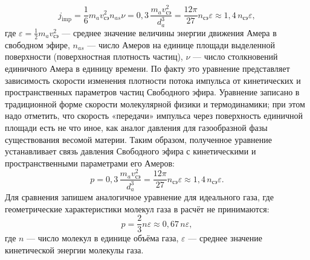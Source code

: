 \[
j_{\text{imp}} = \frac{1}{6} m_a v_{\text{сэ}}^2 n_{as} \nu = 0,3\, \frac{m_a v_{\text{сэ}}^2}{d_a^3} = \frac{12\pi}{27} n_{\text{сэ}} \varepsilon \approx 1,4\, n_{\text{сэ}} \varepsilon,
\]
где \(\varepsilon = \frac{1}{2} m_a v_{\text{сэ}}^2\) — среднее значение величины энергии движения Амера в свободном эфире, \(n_{as}\) — число Амеров на единице площади выделенной поверхности (поверхностная плотность частиц), \(\nu\) — число столкновений единичного Амера в единицу времени. По факту это уравнение представляет зависимость скорости изменения плотности потока импульса от кинетических и пространственных параметров частиц Свободного эфира. Уравнение записано в традиционной форме скорости молекулярной физики и термодинамики; при этом надо отметить, что скорость «передачи» импульса через поверхность единичной площади есть не что иное, как аналог давления для газообразной фазы существования весомой материи. Таким образом, полученное уравнение устанавливает связь давления Свободного эфира с кинетическими и пространственными параметрами его Амеров:
\[
p = 0,3\,\frac{m_a v_{\text{сэ}}^2}{d_a^3} = \frac{12\pi}{27} n_{\text{сэ}} \varepsilon \approx 1,4\, n_{\text{сэ}} \varepsilon.
\]
Для сравнения запишем аналогичное уравнение для идеального газа, где геометрические характеристики молекул газа в расчёт не принимаются:
\[
p = \frac{2}{3} n \varepsilon \approx 0,67\, n \varepsilon,
\]
где \(n\) — число молекул в единице объёма газа, \(\varepsilon\) — среднее значение кинетической энергии молекулы газа.
